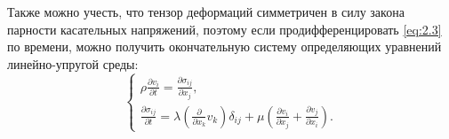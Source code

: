 \documentclass[12pt,a4paper, titlepage, openany]{book}
\begin{document}
Также можно учесть, что тензор деформаций симметричен в силу закона парности касательных напряжений, поэтому если продифференцировать \ref{eq:2.3} по времени, можно получить окончательную систему определяющих уравнений линейно-упругой среды:
\begin{equation}
\label{eq:2.4}
\begin{cases}
\rho \frac{\partial v_i}{\partial t} = \frac{\partial \sigma_{ij}}{\partial x_j}, \\
\frac{\partial \sigma_{ij}}{\partial t} = \lambda(\frac{\partial}{\partial x_k} v_k) \delta_{ij} + \mu(\frac{\partial v_i}{\partial x_j} + \frac{\partial v_j}{\partial x_i}).
\end{cases}
\end{equation}
\end{document}
